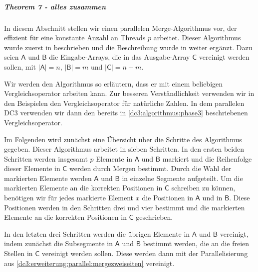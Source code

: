 \subparagraph*{Theorem 7 - alles zusammen}

In diesem Abschnitt stellen wir einen parallelen Merge-Algorithmus vor, der effizient für eine konstante Anzahl an Threads $p$ arbeitet. Dieser Algorithmus wurde zuerst in \cite{merge:valiant} beschrieben und die Beschreibung wurde in \cite{merge:kruskal} weiter ergänzt. Dazu seien $\mathsf{A}$ und $\mathsf{B}$ die Eingabe-Arrays, die in das Ausgabe-Array $\mathsf{C}$ vereinigt werden sollen, mit $|\mathsf{A}|=n$, $|\mathsf{B}|=m$ und $|\mathsf{C}|=n+m$. \par
Wir werden den Algorithmus so erläutern, dass er mit einem beliebigen Vergleichsoperator arbeiten kann. Zur besseren Verständlichkeit verwenden wir in den Beispielen den Vergleichsoperator für natürliche Zahlen. In dem parallelen DC3 verwenden wir dann den bereits in \cref{dc3:algorithmus:phase3} beschriebenen Vergleichsoperator. 

Im Folgenden wird zunächst eine Übersicht über die Schritte des Algorithmus gegeben. Dieser Algorithmus arbeitet in sieben Schritten. In den ersten beiden Schritten werden insgesamt $p$ Elemente in $\mathsf{A}$ und $\mathsf{B}$ markiert und die Reihenfolge dieser Elemente in $\mathsf{C}$ werden durch Mergen bestimmt. Durch die Wahl der markierten Elemente werden $\mathsf{A}$ und $\mathsf{B}$ in einzelne Segmente aufgeteilt. Um die markierten Elemente an die korrekten Positionen in $\mathsf{C}$ schreiben zu können, benötigen wir für jedes markierte Element $x$ die Positionen in $\mathsf{A}$ und in $\mathsf{B}$. Diese Positionen werden in den Schritten drei und vier bestimmt und die markierten Elemente an die korrekten Positionen in $\mathsf{C}$ geschrieben. \par
In den letzten drei Schritten werden die übrigen Elemente in $\mathsf{A}$ und $\mathsf{B}$ vereinigt, indem zunächst die Subsegmente in $\mathsf{A}$ und $\mathsf{B}$ bestimmt werden, die an die freien Stellen in $\mathsf{C}$ vereinigt werden sollen. Diese werden dann mit der Pa\-ral\-le\-li\-sie\-rung aus \cref{dc3:erweiterung:parallel:mergezweiseiten} vereinigt.

